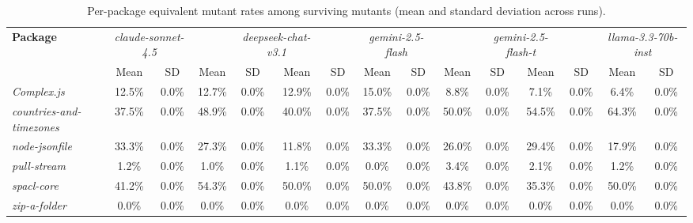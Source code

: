 \begin{table}
\centering
{\tiny
\begin{tabular}{l||cc|cc|cc|cc|cc|cc|cc}
\textbf{Package} & \multicolumn{2}{c|}{\textit{claude-sonnet-4.5}} &  & \multicolumn{2}{c|}{\textit{deepseek-chat-v3.1}} &  & \multicolumn{2}{c|}{\textit{gemini-2.5-flash}} &  & \multicolumn{2}{c|}{\textit{gemini-2.5-flash-t}} &  & \multicolumn{2}{c|}{\textit{llama-3.3-70b-inst}} &  & \multicolumn{2}{c|}{\textit{llama-4-maverick}} &  & \multicolumn{2}{c|}{\textit{gpt-4o-mini}} \\
  & Mean & SD & Mean & SD & Mean & SD & Mean & SD & Mean & SD & Mean & SD & Mean & SD \\
\hline\hline
\textit{Complex.js} & 12.5\% & 0.0\% & 12.7\% & 0.0\% & 12.9\% & 0.0\% & 15.0\% & 0.0\% & 8.8\% & 0.0\% & 7.1\% & 0.0\% & 6.4\% & 0.0\% \\
\textit{countries-and-timezones} & 37.5\% & 0.0\% & 48.9\% & 0.0\% & 40.0\% & 0.0\% & 37.5\% & 0.0\% & 50.0\% & 0.0\% & 54.5\% & 0.0\% & 64.3\% & 0.0\% \\
\textit{node-jsonfile} & 33.3\% & 0.0\% & 27.3\% & 0.0\% & 11.8\% & 0.0\% & 33.3\% & 0.0\% & 26.0\% & 0.0\% & 29.4\% & 0.0\% & 17.9\% & 0.0\% \\
\textit{pull-stream} & 1.2\% & 0.0\% & 1.0\% & 0.0\% & 1.1\% & 0.0\% & 0.0\% & 0.0\% & 3.4\% & 0.0\% & 2.1\% & 0.0\% & 1.2\% & 0.0\% \\
\textit{spacl-core} & 41.2\% & 0.0\% & 54.3\% & 0.0\% & 50.0\% & 0.0\% & 50.0\% & 0.0\% & 43.8\% & 0.0\% & 35.3\% & 0.0\% & 50.0\% & 0.0\% \\
\textit{zip-a-folder} & 0.0\% & 0.0\% & 0.0\% & 0.0\% & 0.0\% & 0.0\% & 0.0\% & 0.0\% & 0.0\% & 0.0\% & 0.0\% & 0.0\% & 0.0\% & 0.0\% \\
\end{tabular}
}
\caption{Per-package equivalent mutant rates among surviving mutants (mean and standard deviation across runs).}
\label{tab:llm-equiv-package}
\end{table}